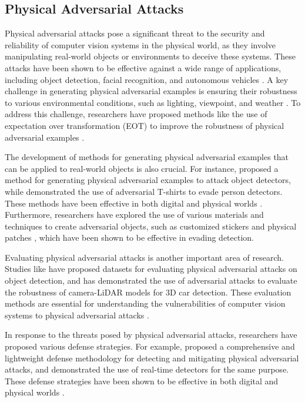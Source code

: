 \documentclass[11pt,a4paper]{article}
\begin{document}
\subsection{Physical Adversarial Attacks}


Physical adversarial attacks pose a significant threat to the security and reliability of computer vision systems in the physical world, as they involve manipulating real-world objects or environments to deceive these systems. These attacks have been shown to be effective against a wide range of applications, including object detection, facial recognition, and autonomous vehicles \cite{arxiv:1707.07397,arxiv:1707.08945}. A key challenge in generating physical adversarial examples is ensuring their robustness to various environmental conditions, such as lighting, viewpoint, and weather \cite{arxiv:1707.08945}. To address this challenge, researchers have proposed methods like the use of expectation over transformation (EOT) to improve the robustness of physical adversarial examples \cite{arxiv:1707.08945}.

The development of methods for generating physical adversarial examples that can be applied to real-world objects is also crucial. For instance, \cite{arxiv:1807.07769} proposed a method for generating physical adversarial examples to attack object detectors, while \cite{arxiv:1910.11099} demonstrated the use of adversarial T-shirts to evade person detectors. These methods have been effective in both digital and physical worlds \cite{arxiv:1807.07769,arxiv:1910.11099}. Furthermore, researchers have explored the use of various materials and techniques to create adversarial objects, such as customized stickers \cite{doi:10.1007/978-3-030-10925-7_4} and physical patches \cite{arxiv:1906.11897}, which have been shown to be effective in evading detection.

Evaluating physical adversarial attacks is another important area of research. Studies like \cite{doi:10.1007/978-3-030-58589-1_3} have proposed datasets for evaluating physical adversarial attacks on object detection, and \cite{doi:10.1109/iros51168.2021.9636638} has demonstrated the use of adversarial attacks to evaluate the robustness of camera-LiDAR models for 3D car detection. These evaluation methods are essential for understanding the vulnerabilities of computer vision systems to physical adversarial attacks \cite{doi:10.1007/978-3-030-58589-1_3,doi:10.1109/iros51168.2021.9636638}.

In response to the threats posed by physical adversarial attacks, researchers have proposed various defense strategies. For example, \cite{doi:10.1109/asp-dac47756.2020.9045584} proposed a comprehensive and lightweight defense methodology for detecting and mitigating physical adversarial attacks, and \cite{doi:10.1145/3450267.3450535} demonstrated the use of real-time detectors for the same purpose. These defense strategies have been shown to be effective in both digital and physical worlds \cite{doi:10.1109/asp-dac47756.2020.9045584,doi:10.1145/3450267.3450535}.
\end{document}
